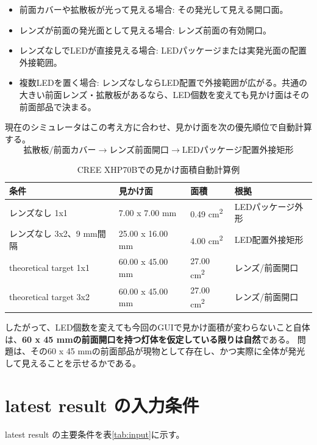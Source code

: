 \documentclass[11pt,a4paper]{article}
\begin{document}
\begin{itemize}
\item 前面カバーや拡散板が光って見える場合: その発光して見える開口面。
\item レンズが前面の発光面として見える場合: レンズ前面の有効開口。
\item レンズなしでLEDが直接見える場合: LEDパッケージまたは実発光面の配置外接範囲。
\item 複数LEDを置く場合: レンズなしならLED配置で外接範囲が広がる。共通の大きい前面レンズ・拡散板があるなら、LED個数を変えても見かけ面はその前面部品で決まる。
\end{itemize}

現在のシミュレータはこの考え方に合わせ、見かけ面を次の優先順位で自動計算する。
\[
\text{拡散板/前面カバー} \rightarrow \text{レンズ前面開口} \rightarrow \text{LEDパッケージ配置外接矩形}
\]

\begin{table}[H]
\centering
\caption{CREE XHP70Bでの見かけ面積自動計算例}
\begin{tabular}{llll}
\toprule
条件 & 見かけ面 & 面積 & 根拠\\
\midrule
レンズなし 1x1 & 7.00 x 7.00 mm & 0.49 cm\textsuperscript{2} & LEDパッケージ外形\\
レンズなし 3x2、9 mm間隔 & 25.00 x 16.00 mm & 4.00 cm\textsuperscript{2} & LED配置外接矩形\\
theoretical target 1x1 & 60.00 x 45.00 mm & 27.00 cm\textsuperscript{2} & レンズ/前面開口\\
theoretical target 3x2 & 60.00 x 45.00 mm & 27.00 cm\textsuperscript{2} & レンズ/前面開口\\
\bottomrule
\end{tabular}
\end{table}

したがって、LED個数を変えても今回のGUIで見かけ面積が変わらないこと自体は、\textbf{60 x 45 mmの前面開口を持つ灯体を仮定している限りは自然}である。
問題は、その60 x 45 mmの前面部品が現物として存在し、かつ実際に全体が発光して見えることを示せるかである。

\section{latest result の入力条件}
latest result の主要条件を表\ref{tab:input}に示す。
\end{document}
